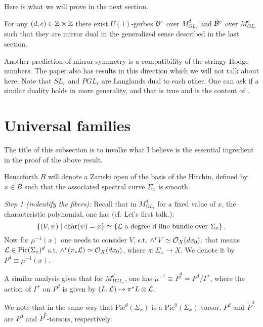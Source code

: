 Here is what we will prove in the next section. 
\begin{thm}
For any $(d,e) \in
\mathbb{Z}\times \mathbb{Z}$ there exist $U(1)$-gerbes $\mathcal{B}^e$ over $M^d_{GL_r}$ and
$\check{\mathcal{B}}^e$ over $M^e_{GL_r}$ such that they are mirror dual in the
generalized sense described in the last section.
\end{thm}

\begin{rem*}
Another prediction of mirror symmetry is a compatibility of the stringy
Hodge numbers. The paper \cite{HT} also has results in this direction
which we will not talk about here.
Note that $SL_r$ and $PGL_r$ are Langlands dual to each other. One can
ask if a similar duality holds in more generality, and that is true
and is the content of \cite{DP}.
\end{rem*}

\section{Universal families}

The title of this subsection is to involke what I believe is the
essential ingredient in the proof of the above result.

Henceforth $B$ will denote a Zariski open of the basis of the Hitchin,
defined by $x \in B$ such that the associated spectral curve
$\Sigma_x$ is smooth.

\textit{Step 1 (indentify the fibers):}
Recall that in $M^d_{GL_r}$ for a fixed
value of $x$, the characteristic polynomial, one has (cf. Lei's first
talk.):
\[\left\{(V,\psi) \; | \; \mbox{char}(\psi) = x\right\} \simeq
\left\{\mathcal{L} \mbox{ a degree d line bundle over }\Sigma_x\right\}.\]
Now for $\mu^{-1}(x)$ one needs to consider $V$, s.t. $\wedge^rV
\simeq \mathcal{O}_X(dx_0)$, that means $\mathcal{L} \in \mbox{Pic}(\Sigma_x)^d$
s.t. $\wedge^r(\pi_*\mathcal{L}) \simeq \mathcal{O}_X(dx_0)$, where $\pi: \Sigma_x \rightarrow
X$. We denote it by $P^d\equiv \mu^{-1}(x)$. 

A similar analysis gives
that for $M^d_{PGL_r}$, one has $\check{\mu}^{-1} \equiv \check{P}^d =
P^d/\Gamma^r$, where the action of $\Gamma^r$ on $P^d$ is given by
$(L,\mathcal{L}) \mapsto \pi^*L\otimes\mathcal{L}$.

We note that in the same way that $\mbox{Pic}^d(\Sigma_x)$ is a
$\mbox{Pic}^0(\Sigma_x)$-torsor, $P^d$ and $\check{P}^d$ are $P^0$ and
$\check{P}^0$-torsors, respectively.

